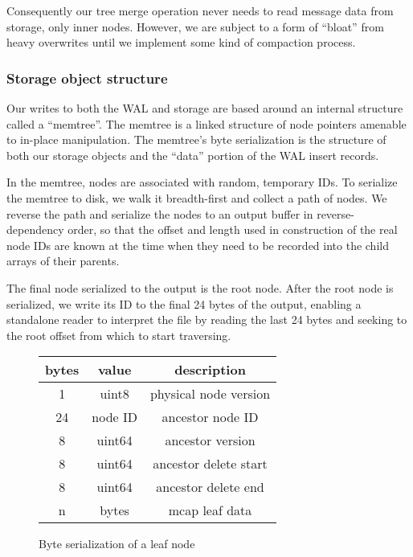 \documentclass[9pt,twocolumn]{article}
\newcommand{\q}[1]{``#1''}
\begin{document}
    Consequently our tree merge operation never needs to read message data from
    storage, only inner nodes. However, we are subject to a form of \q{bloat} from
    heavy overwrites until we implement some kind of compaction process.

    \subsubsection{Storage object structure}
    Our writes to both the WAL and storage are based around an internal structure
    called a \q{memtree}. The memtree is a linked structure of node pointers amenable
    to in-place manipulation. The memtree’s byte serialization is the structure of
    both our storage objects and the \q{data} portion of the WAL insert records.

    In the memtree, nodes are associated with random, temporary IDs. To serialize
    the memtree to disk, we walk it breadth-first and collect a path of nodes. We
    reverse the path and serialize the nodes to an output buffer in
    reverse-dependency order, so that the offset and length used in construction of
    the real node IDs are known at the time when they need to be recorded into the
    child arrays of their parents.

    The final node serialized to the output is the root node. After the root node
    is serialized, we write its ID to the final 24 bytes of the output, enabling a
    standalone reader to interpret the file by reading the last 24 bytes and
    seeking to the root offset from which to start traversing.


    \begin{figure}
      \begin{tabular}{ |c|c|c| }
        \hline
        bytes & value & description \\
        \hline
        1 & uint8 & physical node version \\
        24 & node ID & ancestor node ID \\
        8 & uint64 & ancestor version \\
        8 & uint64 & ancestor delete start \\
        8 & uint64 & ancestor delete end \\
        n & bytes & mcap leaf data \\
        \hline
      \end{tabular}
      \caption{Byte serialization of a leaf node}
      \label{leafstructure}
    \end{figure}
\end{document}
